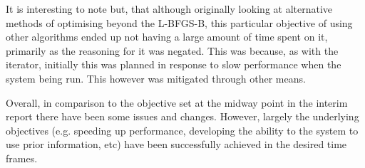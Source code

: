 It is interesting to note but, that although originally looking at alternative methods of optimising beyond the L-BFGS-B, this particular objective of using other algorithms ended up not having a large amount of time spent on it, primarily as the reasoning for it was negated. This was because, as with the iterator, initially this was planned in response to slow performance when the system being run. This however was mitigated through other means. 

Overall, in comparison to the objective set at the midway point in the interim report there have been some issues and changes. However, largely the underlying objectives (e.g. speeding up performance, developing the ability to the system to use prior information, etc) have been successfully achieved in the desired time frames. 
